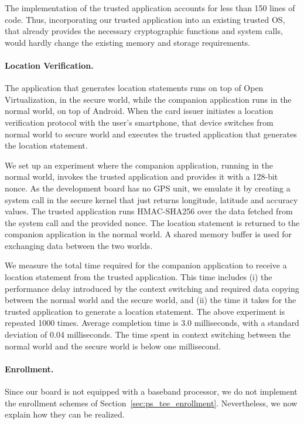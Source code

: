 The implementation of the trusted application accounts for less than 150 lines
of code. Thus, incorporating our trusted application into an existing trusted
OS, that already provides the necessary cryptographic functions and system
calls, would hardly change the existing memory and storage requirements.

\paragraph{Location Verification.}

The application that generates location statements runs on top of Open
Virtualization, in the secure world, while the companion application runs in the
normal world, on top of Android. When the card issuer initiates a location
verification protocol with the user's smartphone, that device switches from
normal world to secure world and executes the trusted application that generates
the location statement.

We set up an experiment where the companion application, running in the normal
world, invokes the trusted application and provides it with a 128-bit nonce. As
the development board has no GPS unit, we emulate it by creating a system call
in the secure kernel that just returns longitude, latitude and accuracy values.
The trusted application runs HMAC-SHA256 over the data fetched from the system
call and the provided nonce. The location statement is returned to the companion
application in the normal world. A shared memory buffer is used for exchanging
data between the two worlds.

We measure the total time required for the companion application to receive a
location statement from the trusted application.  This time includes (i) the
performance delay introduced by the context switching and required data copying
between the normal world and the secure world, and (ii) the time it takes for
the trusted application to generate a location statement. The above experiment
is repeated 1000 times.  Average completion time is 3.0 milliseconds, with a
standard deviation of 0.04 milliseconds. The time spent in context switching
between the normal world and the secure world is below one millisecond.

\paragraph{Enrollment.}

Since our board is not equipped with a baseband processor, we do not implement
the enrollment schemes of Section~\ref{sec:ps_tee_enrollment}.  Nevertheless, we now
explain how they can be realized.

